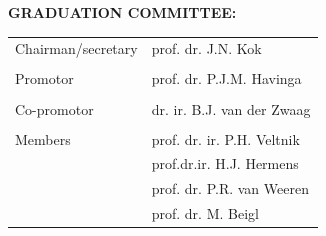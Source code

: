 \begin{titlepage}
   
    \clearpage
    \thispagestyle{empty}
    \raggedright
    \normalsize
    \textbf{GRADUATION COMMITTEE:}\\[2\baselineskip]
    \begin{table}[hb]
    \begin{tabular}{ll}
    Chairman/secretary  & prof. dr. J.N. Kok\\\\    %
    Promotor          & prof. dr. P.J.M. Havinga\\\\
    Co-promotor          & dr. ir. B.J. van der Zwaag\\\\ 
    Members             & prof. dr. ir. P.H. Veltnik\\                      & prof.dr.ir. H.J. Hermens \\
                        & prof. dr. P.R. van Weeren \\
                        & prof. dr. M. Beigl 
                     
    \end{tabular}
    \end{table}


    
    
    
    
    
    
    
\end{titlepage}